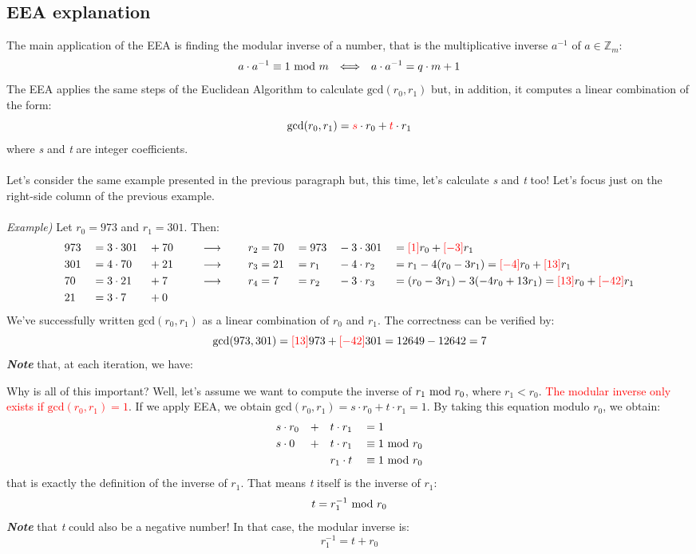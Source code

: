 \newpage
\subsection{EEA explanation}
The main application of the EEA is finding the modular inverse of a number, that is the multiplicative inverse $a^{-1}$ of $a\in\mathbb{Z}_m$:
$$a\cdot a^{-1}\equiv1\text{ mod } m\hspace{0.25cm}\Longleftrightarrow\hspace{0.25cm} a\cdot a^{-1}=q\cdot m + 1$$
The EEA applies the same steps of the Euclidean Algorithm to calculate $\text{gcd}(r_0,r_1)$ but, in addition, it computes a linear combination of the form:
$$\text{gcd}(r_0,r_1)=\textcolor{red}{s}\cdot r_0 + \textcolor{red}{t}\cdot r_1$$
where \textit{s} and \textit{t} are integer coefficients.\\\\
Let's consider the same example presented in the previous paragraph but, this time, let's calculate \textit{s} and \textit{t} too! Let's focus just on the right-side column of the previous example.\\\\
\textit{Example)} Let $r_0=973$ and $r_1=301$. Then:
\begin{alignat*}{8}
    &973&&=3\cdot301&&+70&&\hspace{0.5cm}\longrightarrow\hspace{0.5cm} &&r_2=70&&=973&&-3\cdot301&&=\textcolor{red}{[1]}r_0+\textcolor{red}{[-3]}r_1\\
    &301&&=4\cdot70&&+21&&\hspace{0.5cm}\longrightarrow\hspace{0.5cm} &&r_3=21&&=r_1&&-4\cdot r_2&&=r_1-4(r_0-3r_1)=\textcolor{red}{[-4]}r_0+\textcolor{red}{[13]}r_1\\
    &70&&=3\cdot21&&+7&&\hspace{0.5cm}\longrightarrow\hspace{0.5cm} &&r_4=7&&=r_2&&-3\cdot r_3&&=(r_0-3r_1)-3(-4r_0+13r_1)=\textcolor{red}{[13]}r_0+\textcolor{red}{[-42]}r_1\\
    &21&&=3\cdot7&&+0
\end{alignat*}
We've successfully written $\text{gcd}(r_0,r_1)$ as a linear combination of $r_0$ and $r_1$. The correctness can be verified \nolinebreak by:
$$\text{gcd}(973,301)=\textcolor{red}{[13]}973+\textcolor{red}{[-42]}301=12649-12642=7$$
\textbf{\textit{Note}} that, at each iteration, we have:
\begin{center}
\end{center}
Why is all of this important? Well, let's assume we want to compute the inverse of $r_1\text{ mod } r_0$, where $r_1<r_0$. \textcolor{red}{The modular inverse only exists if $\text{gcd}(r_0,r_1)=1$}. If we apply EEA, we obtain $\text{gcd}(r_0,r_1)=s\cdot r_0+t\cdot r_1=1$. By taking this equation modulo $r_0$, we obtain:
\begin{alignat*}{5}
    &s\cdot r_0&&+&&t\cdot r_1&&=1\\
    &s\cdot 0&&+&&t\cdot r_1&&\equiv1\text{ mod } r_0\\
    & &&&&r_1\cdot t&&\equiv 1\text{ mod } r_0
\end{alignat*}
that is exactly the definition of the inverse of $r_1$. That means \textit{t} itself is the inverse of $r_1$:
$$t=r_1^{-1}\text{ mod } r_0$$
\textbf{\textit{Note}} that \textit{t} could also be a negative number! In that case, the modular inverse is: $$r_1^{-1}=t+r_0$$

